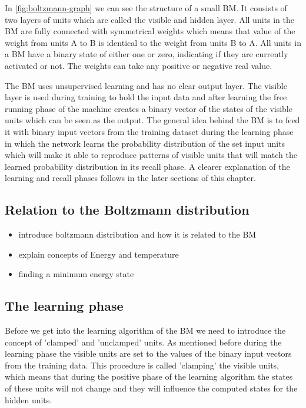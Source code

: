 \documentclass[12pt,twoside]{article}
\theoremstyle{plain}
\theoremstyle{definition}
\theoremstyle{remark}
\begin{document}
\noindent
In \cref{fig:boltzmann-graph} we can see the structure of a small BM. It consists of two layers of units which are called the visible and hidden layer.
All units in the BM are fully connected with symmetrical weights which means that value of the weight from units A to B is identical to
the weight from units B to A. All units in a BM have a binary state of either one or zero, indicating if they are currently activated or not.
The weights can take any positive or negative real value.

The BM uses unsupervised learning and has no clear output layer. The visible layer is used during training to hold the input data and
after learning the free running phase of the machine creates a binary vector of the states of the visible units which can be seen as the output.
The general idea behind the BM is to feed it with binary input vectors from the training dataset during the learning phase
in which the network learns the probability distribution of the set input units which will make it able to reproduce patterns of visible units
that will match the learned probability distribution in its recall phase. A clearer explanation of the learning and recall phases follows in the 
later sections of this chapter.


\subsection{Relation to the Boltzmann distribution}
\begin{itemize}
        \item introduce boltzmann distribution and how it is related to the BM
        \item explain concepts of Energy and temperature
        \item finding a minimum energy state
\end{itemize}

\subsection{The learning phase}
Before we get into the learning algorithm of the BM we need to introduce the concept of 'clamped' and 'unclamped' units.
As mentioned before during the learning phase the visible units are set to the values of the binary input vectors from the training data.
This procedure is called 'clamping' the visible units, which means that during the positive phase of the learning
algorithm the states of these units will not change and they will influence the computed states for the hidden units.
\end{document}
